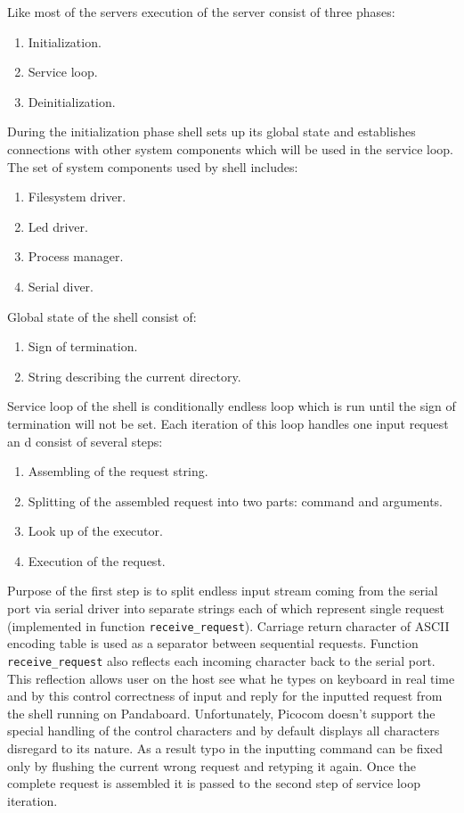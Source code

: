 \documentclass[a4paper,10pt]{article}
\begin{document}
	Like most of the servers execution of the server consist of three phases:
	\begin{enumerate}
		\item Initialization.
		\item Service loop.
		\item Deinitialization.
	\end{enumerate}
	During the initialization phase shell sets up its global state and establishes connections with other system components which will be used in the service loop.
	The set of system components used by shell includes:
	\begin{enumerate}
		\item Filesystem driver.
		\item Led driver.
		\item Process manager.
		\item Serial diver.
	\end{enumerate}
	Global state of the shell consist of:
	\begin{enumerate}
		\item Sign of termination.
		\item String describing the current directory.
	\end{enumerate}
	
	Service loop of the shell is conditionally endless loop which is run until the sign of termination will not be set. 
	Each iteration of this loop handles one input request an d consist of several steps:
	\begin{enumerate}
		\item Assembling of the request string.
		\item Splitting of the assembled request into two parts: command and arguments.
		\item Look up of the executor.
		\item Execution of the request.
	\end{enumerate} 
	Purpose of the first step is to split endless input stream coming from the serial port via serial driver into separate strings each of which represent single request (implemented in function \lstinline!receive_request!).
	Carriage return character of ASCII encoding table is used as a separator between sequential requests.
	Function \lstinline!receive_request! also reflects each incoming character back to the serial port.
	This reflection allows user on the host see what he types on keyboard in real time and by this control correctness of input and reply for the inputted request from the shell running on Pandaboard.
	Unfortunately, Picocom doesn't support the special handling of the control characters and by default displays all characters disregard to its nature.
	As a result typo in the inputting command can be fixed only by flushing the current wrong request and retyping it again.
	Once the complete request is assembled it is passed to the second step of service loop iteration.
	  
\end{document}
